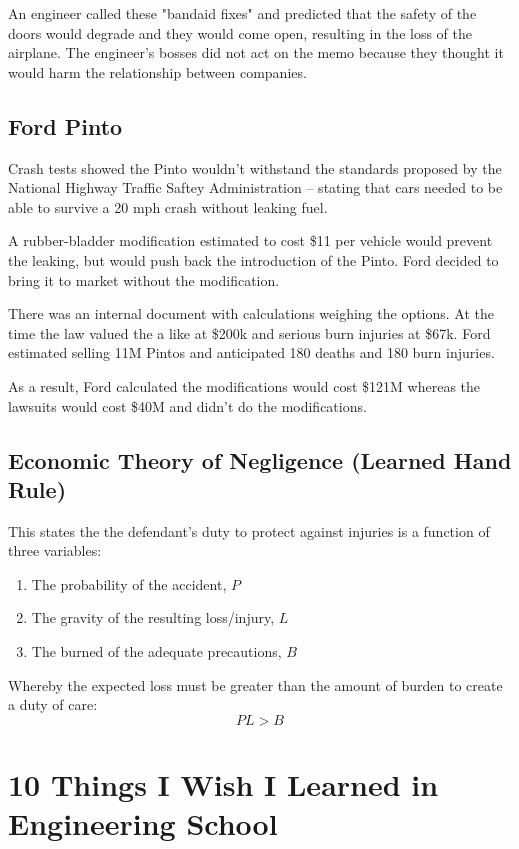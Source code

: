 \documentclass{article}
\begin{document}
An engineer called these "bandaid fixes" and predicted that the safety of the doors would degrade and they would come open, resulting in the loss of the airplane. The engineer's bosses did not act on the memo because they thought it would harm the relationship between companies.

\subsection{Ford Pinto}

Crash tests showed the Pinto wouldn't withstand the standards proposed by the National Highway Traffic Saftey Administration -- stating that cars needed to be able to survive a 20 mph crash without leaking fuel.

A rubber-bladder modification estimated to cost \$11 per vehicle would prevent the leaking, but would push back the introduction of the Pinto. Ford decided to bring it to market without the modification.

There was an internal document with calculations weighing the options. At the time the law valued the a like at \$200k and serious burn injuries at \$67k. Ford estimated selling 11M Pintos and anticipated 180 deaths and 180 burn injuries. 

As a result, Ford calculated the modifications would cost \$121M whereas the lawsuits would cost \$40M and didn't do the modifications.

\subsection{Economic Theory of Negligence (Learned Hand Rule)}

This states the the defendant's duty to protect against injuries is a function of three variables: \begin{enumerate}
\item The probability of the accident, $P$
\item The gravity of the resulting loss/injury, $L$
\item The burned of the adequate precautions, $B$
\end{enumerate} Whereby the expected loss must be greater than the amount of burden to create a duty of care: $$PL > B$$ 

\section{10 Things I Wish I Learned in Engineering School}
\end{document}

